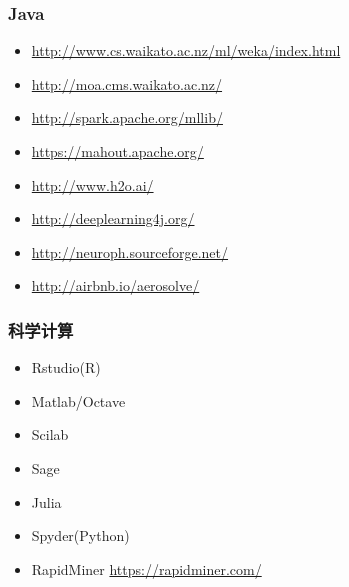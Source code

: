\documentclass{beamer}
\begin{document}
\begin{frame}
\frametitle{Java}
\label{sec-7-4}

\begin{itemize}
\item \href{http://www.cs.waikato.ac.nz/ml/weka/index.html}{http://www.cs.waikato.ac.nz/ml/weka/index.html}
\item \href{http://moa.cms.waikato.ac.nz/}{http://moa.cms.waikato.ac.nz/}
\item \href{http://spark.apache.org/mllib/}{http://spark.apache.org/mllib/}
\item \href{https://mahout.apache.org/}{https://mahout.apache.org/}
\item \href{http://www.h2o.ai/}{http://www.h2o.ai/}
\item \href{http://deeplearning4j.org/}{http://deeplearning4j.org/}
\item \href{http://neuroph.sourceforge.net/}{http://neuroph.sourceforge.net/}
\item \href{http://airbnb.io/aerosolve/}{http://airbnb.io/aerosolve/}
\end{itemize}
\end{frame}
\begin{frame}
\frametitle{科学计算}
\label{sec-7-5}

\begin{itemize}
\item Rstudio(R)
\item Matlab/Octave
\item Scilab
\item Sage
\item Julia
\item Spyder(Python)
\item RapidMiner \href{https://rapidminer.com/}{https://rapidminer.com/}
\end{itemize}
\end{frame}
\end{document}
